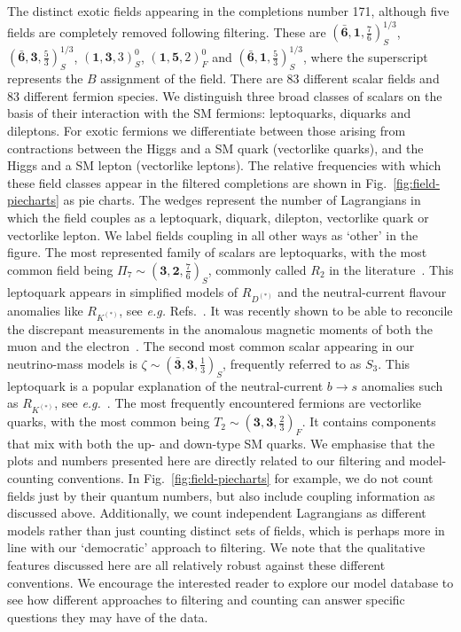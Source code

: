The distinct exotic fields appearing in the completions number 171, although
five fields are completely removed following filtering. These are
$(\mathbf{\bar{6}}, \mathbf{1}, \tfrac{7}{6})_{S}^{1/3}$,
$(\mathbf{\bar{6}}, \mathbf{3}, \tfrac{5}{3})_{S}^{1/3}$,
$(\mathbf{1}, \mathbf{3}, 3)^{0}_{S}$, $(\mathbf{1}, \mathbf{5}, 2)^{0}_{F}$ and
$(\mathbf{\bar{6}}, \mathbf{1}, \tfrac{5}{3})^{1/3}_{S}$, where the superscript
represents the $B$ assignment of the field. There are 83 different scalar fields
and 83 different fermion species. We distinguish three broad classes of scalars
on the basis of their interaction with the SM fermions: leptoquarks, diquarks
and dileptons. For exotic fermions we differentiate between those arising from
contractions between the Higgs and a SM quark (vectorlike quarks), and the Higgs
and a SM lepton (vectorlike leptons). The relative frequencies with which these
field classes appear in the filtered completions are shown in
Fig.~\ref{fig:field-piecharts} as pie charts. The wedges represent the number of
Lagrangians in which the field couples as a leptoquark, diquark, dilepton,
vectorlike quark or vectorlike lepton. We label fields coupling in all other
ways as `other' in the figure. The most represented family of scalars are
leptoquarks, with the most common field being
$\Pi_{7} \sim (\mathbf{3}, \mathbf{2}, \tfrac{7}{6})_{S}$, commonly called
$R_{2}$ in the literature~\cite{Dorsner:2016wpm}. This leptoquark appears in
simplified models of $R_{D^{(*)}}$ and the neutral-current flavour anomalies
like $R_{K^{(*)}}$, see \textit{e.g.} Refs.~\cite{Sakaki:2013bfa,
  Angelescu:2018tyl, Becirevic:2018uab, Popov:2019tyc, Becirevic:2017jtw}. It
was recently shown to be able to reconcile the discrepant measurements in the
anomalous magnetic moments of both the muon and the
electron~\cite{Bigaran:2020jil, Dorsner:2020aaz}. The second most common scalar
appearing in our neutrino-mass models is
$\zeta \sim (\mathbf{\bar{3}}, \mathbf{3}, \tfrac{1}{3})_{S}$, frequently
referred to as $S_{3}$. This leptoquark is a popular explanation of the
neutral-current $b \to s$ anomalies such as $R_{K^{(*)}}$, see
\textit{e.g.}~\cite{Hiller:2014yaa, Gripaios:2014tna, Hiller:2017bzc,
  Dorsner:2017ufx, Angelescu:2018tyl}. The most frequently encountered fermions
are vectorlike quarks, with the most common being
$T_{2}\sim (\mathbf{3}, \mathbf{3}, \tfrac{2}{3})_{F}$. It contains components
that mix with both the up- and down-type SM quarks. We emphasise that the plots
and numbers presented here are directly related to our filtering and
model-counting conventions. In Fig.~\ref{fig:field-piecharts} for example, we do
not count fields just by their quantum numbers, but also include coupling
information as discussed above. Additionally, we count independent Lagrangians
as different models rather than just counting distinct sets of fields, which is
perhaps more in line with our `democratic' approach to filtering. We note that
the qualitative features discussed here are all relatively robust against these
different conventions. We encourage the interested reader to explore our model
database to see how different approaches to filtering and counting can answer
specific questions they may have of the data.

